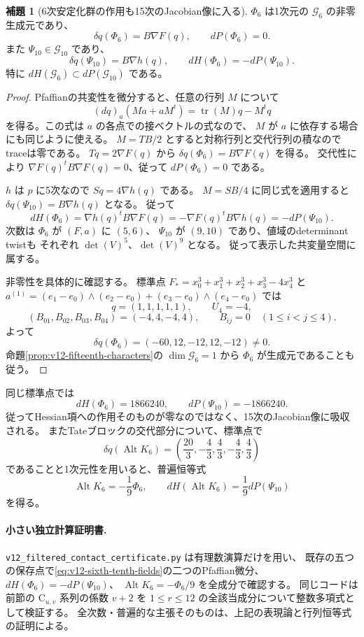\documentclass[a4paper,11pt]{ltjsarticle}
\theoremstyle{definition}
\newtheorem{lemma}[theorem]{補題}
\begin{document}
\begin{lemma}[6次安定化群の作用も15次のJacobian像に入る]
\label{lem:v12-sixth-hessian-action}
$\Phi_6$ は1次元の $\mathcal G_6$ の非零生成元であり、
\[
 \delta q(\Phi_6)=B\nabla F(q),\qquad dP(\Phi_6)=0.
\]
また $\Psi_{10}\in\mathcal G_{10}$ であり、
\[
 \delta q(\Psi_{10})=B\nabla h(q),\qquad
 dH(\Phi_6)=-dP(\Psi_{10}).
\]
特に $dH(\mathcal G_6)\subset dP(\mathcal G_{10})$ である。
\end{lemma}
\begin{proof}
Pfaffianの共変性を微分すると、任意の行列 $M$ について
\[
 (dq)_a(Ma+aM^t)=\operatorname{tr}(M)q-M^tq
\]
を得る。この式は $a$ の各点での接ベクトルの式なので、
$M$ が $a$ に依存する場合にも同じように使える。
$M=TB/2$ とすると対称行列と交代行列の積なのでtraceは零である。
$Tq=2\nabla F(q)$ から $\delta q(\Phi_6)=B\nabla F(q)$ を得る。
交代性により $\nabla F(q)^tB\nabla F(q)=0$、従って $dP(\Phi_6)=0$ である。

$h$ は $p$ に5次なので $Sq=4\nabla h(q)$ である。
$M=SB/4$ に同じ式を適用すると
$\delta q(\Psi_{10})=B\nabla h(q)$ となる。
従って
\[
 dH(\Phi_6)=\nabla h(q)^tB\nabla F(q)
 =-\nabla F(q)^tB\nabla h(q)=-dP(\Psi_{10}).
\]
次数は $\Phi_6$ が $(F,a)$ に $(5,6)$、
$\Psi_{10}$ が $(9,10)$ であり、値域のdeterminant twistも
それぞれ $\det(V)^5$、$\det(V)^9$ となる。
従って表示した共変量空間に属する。

非零性を具体的に確認する。
標準点 $F_*=x_0^3+x_1^3+x_2^3+x_3^3-4x_4^3$ と
$a^{(1)}=(e_1-e_0)\wedge(e_2-e_0)+(e_3-e_0)\wedge(e_4-e_0)$ では
\[
 q=(1,1,1,1,1),\qquad U_4=-4,
\]
\[
 (B_{01},B_{02},B_{03},B_{04})=(-4,4,-4,4),\qquad
 B_{ij}=0\quad(1\le i<j\le4).
\]
よって
\[
 \delta q(\Phi_6)=(-60,12,-12,12,-12)\ne0.
\]
命題\ref{prop:v12-fifteenth-characters}の $\dim\mathcal G_6=1$ から
$\Phi_6$ が生成元であることも従う。
\end{proof}

同じ標準点では
\[
 dH(\Phi_6)=1866240,\qquad dP(\Psi_{10})=-1866240.
\]
従ってHessian項への作用そのものが零なのではなく、15次のJacobian像に吸収される。
またTateブロックの交代部分について、標準点で
\[
 \delta q(\operatorname{Alt}K_6)
   =\left(\frac{20}{3},-\frac43,\frac43,-\frac43,\frac43\right)
\]
であることと1次元性を用いると、普遍恒等式
\[
 \operatorname{Alt}K_6=-\frac19\Phi_6,
 \qquad dH(\operatorname{Alt}K_6)=\frac19dP(\Psi_{10})
\]
を得る。

\paragraph{小さい独立計算証明書.}
\texttt{v12\_filtered\_contact\_certificate.py} は有理数演算だけを用い、
既存の五つの保存点で\eqref{eq:v12-sixth-tenth-fields}の二つのPfaffian微分、
$dH(\Phi_6)=-dP(\Psi_{10})$、
$\operatorname{Alt}K_6=-\Phi_6/9$ を全成分で確認する。
同じコードは前節の $\mathrm C_{u,v}$ 系列の係数 $v+2$ を
$1\le r\le12$ の全該当成分について整数多項式として検証する。
全次数・普遍的な主張そのものは、上記の表現論と行列恒等式の証明による。
\end{document}
